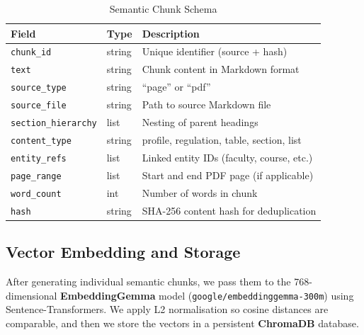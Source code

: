 \documentclass[12pt,a4paper]{report}
\begin{document}
\begin{table}[htbp]
  \centering
    \vspace*{5pt}
  \begin{tabular}{|l|l|p{6cm}|}
    \hline
    \textbf{Field} & \textbf{Type} & \textbf{Description} \\ \hline
    \texttt{chunk\_id}           & string   & Unique identifier (source + hash)          \\ \hline
    \texttt{text}                & string   & Chunk content in Markdown format           \\ \hline
    \texttt{source\_type}        & string   & ``page'' or ``pdf''                        \\ \hline
    \texttt{source\_file}        & string   & Path to source Markdown file               \\ \hline
    \texttt{section\_hierarchy}  & list     & Nesting of parent headings                 \\ \hline
    \texttt{content\_type}       & string   & profile, regulation, table, section, list  \\ \hline
    \texttt{entity\_refs}        & list     & Linked entity IDs (faculty, course, etc.)  \\ \hline
    \texttt{page\_range}         & list     & Start and end PDF page (if applicable)     \\ \hline
    \texttt{word\_count}         & int      & Number of words in chunk                   \\ \hline
    \texttt{hash}                & string   & SHA-256 content hash for deduplication     \\ \hline
  \end{tabular}
  \caption{Semantic Chunk Schema}
  \label{tab:chunk_schema}

\end{table}

\subsection{Vector Embedding and Storage}

After generating individual semantic chunks, we pass them to the 768-dimensional \textbf{EmbeddingGemma} model (\texttt{google/embeddinggemma-300m}) using Sentence-Transformers. We apply L2 normalisation so cosine distances are comparable, and then we store the vectors in a persistent \textbf{ChromaDB} database.
\end{document}
